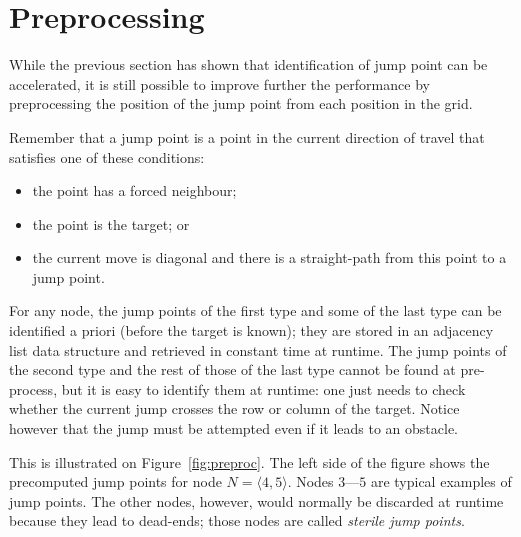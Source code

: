 \begin{figure*}[tb]
       \label{fig:preproc}
       \begin{center}
         \scalebox{.8}{}
       \end{center}
       \caption{(a) A jump point is computed in place of each grid neighbour of node $x$.
		(b) When jumping from $x$ to $y$ we may cross the row or column of the target $t$ (here, both). 
To avoid jumping over $t$ we insert an intermediate successor $y'$ on the row or column of $t$ (whichever is closest to $x$).}
\end{figure*}

\section{Preprocessing}
\label{sec::preprocessing}

While the previous section has shown 
that identification of jump point can be accelerated, 
it is still possible to improve further the performance 
by preprocessing the position of the jump point 
from each position in the grid.  

Remember that a jump point 
is a point in the current direction of travel 
that satisfies one of these conditions: 
\begin{itemize}
\item 
  the point has a forced neighbour; 
\item 
  the point is the target; or 
\item 
  the current move is diagonal 
  and there is a straight-path from this point to a jump point.  
\end{itemize}
For any node, 
the jump points of the first type and some of the last type 
can be identified a priori (before the target is known); 
they are stored in an adjacency list data structure 
and retrieved in constant time at runtime.  
The jump points of the second type and the rest of those of the last type 
cannot be found at pre-process, 
but it is easy to identify them at runtime: 
one just needs to check whether the current jump 
crosses the row or column of the target.  
Notice however that the jump must be attempted 
even if it leads to an obstacle.  

This is illustrated on Figure~\ref{fig:preproc}.  
The left side of the figure shows the precomputed jump points 
for node $N = \langle 4,5\rangle$.  
Nodes $3$---$5$ are typical examples of jump points.  
The other nodes, however, would normally be discarded 
at runtime because they lead to dead-ends; 
those nodes are called \emph{sterile jump points}.  

